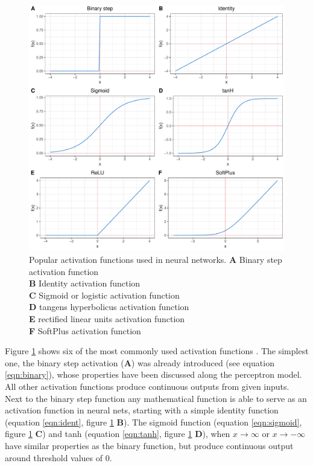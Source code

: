 \begin{figure}[H]
\centering
\includegraphics[height=.55\textheight, width=.85\textwidth]{Figures/activation}
\decoRule
\caption[Popular activation functions for neural networks]{Popular activation functions used in
  neural networks.
  \textbf{A} Binary step activation function \\
  \textbf{B} Identity activation function \\
  \textbf{C} Sigmoid or logistic activation function \\
  \textbf{D} tangens hyperbolicus activation function \\
  \textbf{E} rectified linear units activation function \\
  \textbf{F} SoftPlus activation function\\}
\label{fig:activation}
\end{figure}


Figure \ref{fig:activation} shows six of the most commonly used activation functions
\cite{warner1996understanding}. The simplest one, the binary step activation (\textbf{A})
was already introduced (see equation \ref{eqn:binary}), whose properties have been
discussed along the perceptron model. All other activation functions produce continuous outputs from given inputs. \\
Next to the binary step function any mathematical function is able to serve as an
activation function in neural nets, starting with a simple identity function (equation
\ref{eqn:ident}, figure \ref{fig:activation} \textbf{B}). The sigmoid function (equation \ref{eqn:sigmoid}, figure
\ref{fig:activation} \textbf{C}) and tanh (equation \ref{eqn:tanh}, figure
\ref{fig:activation} \textbf{D}), when $x \rightarrow \infty$ or
$x \rightarrow -\infty$ have similar properties as the binary function, but produce
continuous output around threshold values of 0.

